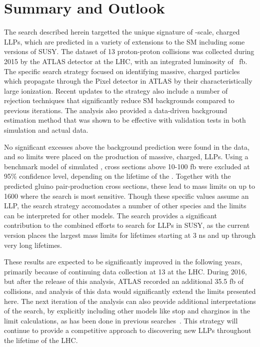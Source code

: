 \chapter{Summary and Outlook}

\label{ch:conclusion}

The search described herein targetted the unique signature of \TeV-scale, charged \acp{LLP}, which are predicted in a variety of extensions to the \ac{SM} including some versions of \ac{SUSY}.
The dataset of 13 \TeV proton-proton collisions was collected during 2015 by the ATLAS detector at the \ac{LHC}, with an integrated luminosity of \lumi~fb.
The specific search strategy focused on identifying massive, charged particles which propagate through the Pixel detector in ATLAS by their characteristically large ionization.
Recent updates to the strategy also include a number of rejection techniques that significantly reduce \ac{SM} backgrounds compared to previous iterations.
The analysis also provided a data-driven background estimation method that was shown to be effective with validation tests in both simulation and actual data.

No significant excesses above the background prediction were found in the data, and so limits were placed on the production of massive, charged, \acp{LLP}.
Using a benchmark model of simulated \rhadrons, cross sections above 10-100 fb were excluded at 95\% confidence level, depending on the lifetime of the \rhadron.
Together with the predicted gluino pair-production cross sections, these lead to mass limits on \rhadrons up to 1600 \GeV where the search is most sensitive.
Though these specific values assume an \rhadron \ac{LLP}, the search strategy accomodates a number of other species and the limits can be interpreted for other models.
The search provides a significant contribution to the combined efforts to search for \acp{LLP} in \ac{SUSY}, as the current version places the largest mass limits for lifetimes starting at 3 ns and up through very long lifetimes.

These results are expected to be significantly improved in the following years, primarily because of continuing data collection at 13 \TeV at the \ac{LHC}.
During 2016, but after the release of this analysis, ATLAS recorded an additional 35.5 fb of collisions, and analysis of this data would significantly extend the limits presented here.
The next iteration of the analysis can also provide additional interpretations of the search, by explicitly including other models like stop \rhadrons and charginos in the limit calculations, as has been done in previous searches~\cite{SUSY-2014-09}.
This strategy will continue to provide a competitive approach to discovering new \acp{LLP} throughout the lifetime of the \ac{LHC}.

